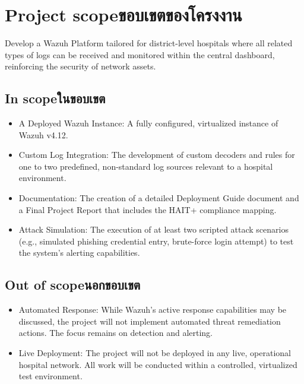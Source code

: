 \section{\ifenglish Project scope\else ขอบเขตของโครงงาน\fi}
    Develop a Wazuh Platform tailored for district-level hospitals where all related types of logs can be received and monitored within the central dashboard, reinforcing the security of network assets.
    
\subsection{\ifenglish In scope\else ในขอบเขต\fi}
\begin{itemize}
    \item{A Deployed Wazuh Instance: A fully configured, virtualized instance of Wazuh v4.12.}
    \item{Custom Log Integration: The development of custom decoders and rules for one to two predefined, non-standard log sources relevant to a hospital environment.}
    \item{Documentation: The creation of a detailed Deployment Guide document and a Final Project Report that includes the HAIT+ compliance mapping.}
    \item{Attack Simulation: The execution of at least two scripted attack scenarios (e.g., simulated phishing credential entry, brute-force login attempt) to test the system's alerting capabilities.}
\end{itemize}
\subsection{\ifenglish Out of scope\else นอกขอบเขต\fi}
\begin{itemize}
    \item {Automated Response: While Wazuh's active response capabilities may be discussed, the project will not implement automated threat remediation actions. The focus remains on detection and alerting.}
    \item{Live Deployment: The project will not be deployed in any live, operational hospital network. All work will be conducted within a controlled, virtualized test environment.}
\end{itemize}
